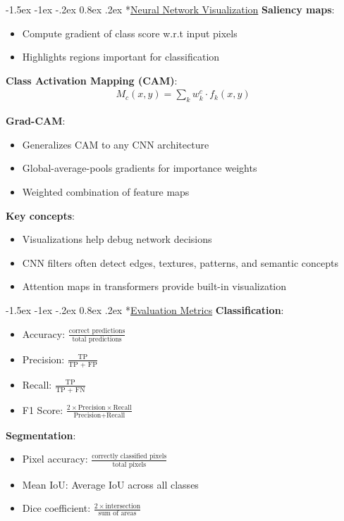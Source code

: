 \documentclass{article}
\makeatletter
\renewcommand\section{\@startsection{section}{1}{\z@}%
                                  {-1.5ex \@plus -1ex \@minus -.2ex}%
                                  {0.8ex \@plus.2ex}%
                                  {\normalfont\small\bfseries}}
\makeatother
\begin{document}
\begin{multicols}{3}
\section*{\underline{Neural Network Visualization}}
\textbf{Saliency maps}:
\begin{itemize}
\item Compute gradient of class score w.r.t input pixels
\item Highlights regions important for classification
\end{itemize}

\textbf{Class Activation Mapping (CAM)}:
\begin{align*}
M_c(x,y) = \sum_k w_k^c \cdot f_k(x,y)
\end{align*}

\textbf{Grad-CAM}:
\begin{itemize}
\item Generalizes CAM to any CNN architecture
\item Global-average-pools gradients for importance weights
\item Weighted combination of feature maps
\end{itemize}

\textbf{Key concepts}:
\begin{itemize}
\item Visualizations help debug network decisions
\item CNN filters often detect edges, textures, patterns, and semantic concepts
\item Attention maps in transformers provide built-in visualization
\end{itemize}

\section*{\underline{Evaluation Metrics}}
\textbf{Classification}:
\begin{itemize}
\item Accuracy: $\frac{\text{correct predictions}}{\text{total predictions}}$
\item Precision: $\frac{\text{TP}}{\text{TP + FP}}$
\item Recall: $\frac{\text{TP}}{\text{TP + FN}}$
\item F1 Score: $\frac{2 \times \text{Precision} \times \text{Recall}}{\text{Precision} + \text{Recall}}$
\end{itemize}

\textbf{Segmentation}:
\begin{itemize}
\item Pixel accuracy: $\frac{\text{correctly classified pixels}}{\text{total pixels}}$
\item Mean IoU: Average IoU across all classes
\item Dice coefficient: $\frac{2 \times \text{intersection}}{\text{sum of areas}}$
\end{itemize}


\end{multicols}
\end{document}
